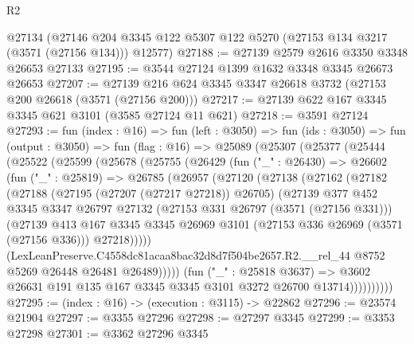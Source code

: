 \begin{lexlean}{R2}
\begin{coremodule}
    @27134
    (@27146 @204 @3345 @122 @5307 @122 @5270 (@27153 @134 @3217 (@3571 (@27156 @134))) @12577)
@27188 := @27139 @2579 @2616 @3350 @3348 @26653 @27133
@27195 := @3544 @27124 @1399 @1632 @3348 @3345 @26673 @26653
@27207 := @27139 @216 @624 @3345 @3347 @26618 @3732 (@27153 @200 @26618 (@3571 (@27156 @200)))
@27217 := @27139 @622 @167 @3345 @3345 @621 @3101 (@3585 @27124 @11 @621)
@27218 := @3591 @27124
@27293 := fun (index : @16) =>
  fun (left : @3050) =>
  fun (ids : @3050) =>
  fun (output : @3050) =>
  fun (flag : @16) =>
  @25089
    (@25307
      (@25377
        (@25444
          (@25522
            (@25599
              (@25678
                (@25755
                  (@26429
                    (fun ("_" : @26430) =>
                    @26602
                      (fun ("_" : @25819) =>
                      @26785
                        (@26957
                          (@27120
                            (@27138
                              (@27162
                                (@27182
                                  (@27188
                                    (@27195 (@27207 (@27217 @27218)) @26705)
                                    (@27139
                                      @377
                                      @452
                                      @3345
                                      @3347
                                      @26797
                                      @27132
                                      (@27153 @331 @26797 (@3571 (@27156 @331)))
                                      (@27139
                                        @413
                                        @167
                                        @3345
                                        @3345
                                        @26969
                                        @3101
                                        (@27153 @336 @26969 (@3571 (@27156 @336)))
                                        @27218)))))
                              (LexLeanPreserve.C4558dc81acaa8bac32d8d7f504be2657.R2.__rel_44
                                @8752
                                @5269
                                @26448
                                @26481
                                @26489)))))
                      (fun ("_" : @25818 @3637) =>
                      @3602 @26631 @191 @135 @167 @3345 @3345 @3101 @3272 @26700 @13714))))))))))
@27295 := (index : @16) -> (execution : @3115) -> @22862
@27296 := @23574 @21904
@27297 := @3355 @27296
@27298 := @27297 @3345
@27299 := @3353 @27298
@27301 := @3362 @27296 @3345

\end{coremodule}
\end{lexlean}
